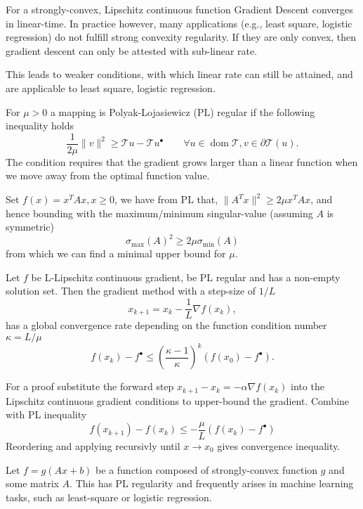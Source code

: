 \documentclass[varwidth=15cm, border=.5cm]{standalone}
\DeclareMathOperator{\domain}{dom}
\newcommand{\optimal}[1]{{#1^{\scriptscriptstyle\bullet}}}
\begin{document}
\begin{definition}[label=3rjrllrr, name=Strong Convexity Regularity]
	\begin{remark}[label=4nciih04, name=Strong Convexity in Practice]
		For a strongly-convex, Lipschitz continuous function Gradient
		Descent converges in linear-time. In practice however, many
		applications (e.g., least square, logistic regression) do not
		fulfill strong convexity regularity. If they are only convex,
		then gradient descent can only be attested with sub-linear
		rate.

		This leads to weaker conditions, with which linear rate can
		still be attained, and are applicable to least square, logistic
		regression.
	\end{remark}
\end{definition}

\begin{definition}[label=xt9s0uma, name=Polyak-Lojasiewicz Regularity]
	For \(\mu > 0\) a mapping is Polyak-Lojasiewicz (PL) regular if the following 
	inequality holds
	\[
		\frac{1}{2\mu}\lVert v\rVert^2 \geq \mathcal T u - \mathcal T\optimal{u} \qquad \forall u\in\domain{\mathcal T}, v \in \partial\mathcal T(u).
	\]
	The condition requires that the gradient grows larger than a linear
	function when we move away from the optimal function value. 

	\begin{example}[label=ckhagcj4, name=Example for a quadratic function]
		Set \(f(x) = x^TAx, x\geq0\), we have from PL that,
		\(\lVert A^Tx\rVert^2 \geq 2\mu x^TAx\), and hence bounding with
		the maximum/minimum singular-value (assuming \(A\) is symmetric)
		\[
			\sigma_\text{max}(A)^2 \geq 2\mu\sigma_\text{min}(A)
		\]
		from which we can find a minimal upper bound for \(\mu\).
	\end{example}

	\begin{theorem}[label=zs9zsqoh, name=Convergence of Gradient Descent]
		Let \(f\) be L-Lipschitz continuous gradient, be PL regular and
		has a non-empty solution set. Then the gradient method with a
		step-size of \(1/L\)
		\[
			x_{k+1}=x_k-\frac{1}{L}\nabla f(x_k),
		\]
		has a global convergence rate depending on the function condition
		number \(\kappa = L/\mu\)
		\[
			f(x_k) - \optimal{f}\leq\left(\frac{\kappa-1}{\kappa}\right)^k(f(x_0) - \optimal{f}).
		\]

		For a proof substitute the forward step
		\(x_{k+1}-x_k=-\alpha\nabla f(x_k)\) into the Lipschitz
		continuous gradient conditions to upper-bound the gradient.
		Combine with PL inequality
		\[
			f(x_{k+1})-f(x_k) \leq -\frac{\mu}{L}(f(x_k) - \optimal{f})
		\]
		Reordering and applying recursivly until \(x\to x_0\) gives
		convergence inequality.
	\end{theorem}
	\begin{example}[label=jab2zae3, name=Strongly-convex composed with linear]
		Let \(f = g(Ax + b)\) be a function composed of strongly-convex 
		function \(g\) and some matrix \(A\). This has PL regularity and
		frequently arises in machine learning tasks, such as
		least-square or logistic regression.
	\end{example}


\end{definition}
\end{document}
